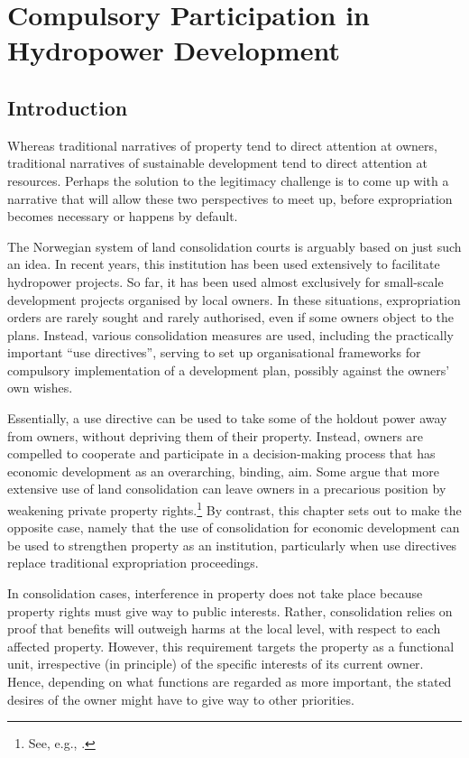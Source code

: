 \chapter{Compulsory Participation in Hydropower Development}\label{chap:6}

\section{Introduction}\label{sec:intro6}

Whereas traditional narratives of property tend to direct attention at owners, traditional narratives of sustainable development tend to direct attention at resources. Perhaps the solution to the legitimacy challenge is to come up with a narrative that will allow these two perspectives to meet up, before expropriation becomes necessary or happens by default.

The Norwegian system of land consolidation courts is arguably based on just such an idea. In recent years, this institution has been used extensively to facilitate hydropower projects. So far, it has been used almost exclusively for small-scale development projects organised by local owners. In these situations, expropriation orders are rarely sought and rarely authorised, even if some owners object to the plans. Instead, various consolidation measures are used, including the practically important ``use directives'', serving to set up organisational frameworks for compulsory implementation of a development plan, possibly against the owners' own wishes.

Essentially, a use directive can be used to take some of the holdout power away from owners, without depriving them of their property. Instead, owners are compelled to cooperate and participate in a decision-making process that has economic development as an overarching, binding, aim. Some argue that more extensive use of land consolidation can leave owners in a precarious position by weakening private property rights.\footnote{See, e.g., \cite{stenseth07}.} By contrast, this chapter sets out to make the opposite case, namely that the use of consolidation for economic development can be used to strengthen property as an institution, particularly when use directives replace traditional expropriation proceedings.

In consolidation cases, interference in property does not take place because property rights must give way to public interests. Rather, consolidation relies on proof that benefits will outweigh harms at the local level, with respect to each affected property. However, this requirement targets the property as a functional unit, irrespective (in principle) of the specific interests of its current owner. Hence, depending on what functions are regarded as more important, the stated desires of the owner might have to give way to other priorities.

